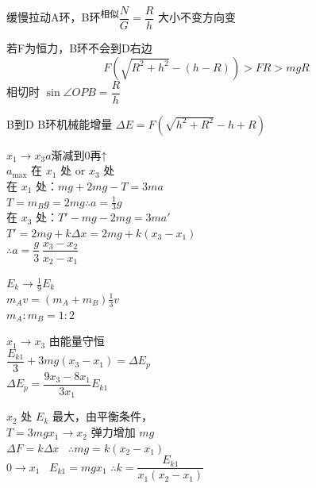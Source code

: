 缓慢拉动A环，B环\textsuperscript{相似}$\dfrac NG=\dfrac Rh$ 大小不变方向变

若F为恒力，B环不会到D右边 %
\[
F\left(\sqrt{R^2+h^2}-(h-R)\right)>FR>mgR
\]
相切时 $\sin\angle OPB=\dfrac Rh$

B到D B环机械能增量 $\Delta E=F\left(\sqrt{h^2+R^2}-h+R\right)$


$x_1\to x_3$\quad $a$渐减到0再↑\\
$a_{\max}$ 在 $x_1$ 处 or $x_3$ 处\\
在 $x_1$ 处：$mg+2mg-T=3ma$\\
\hspace*{3em}$T=m_Bg=2mg$\quad $\therefore a=\frac13 g$\\
在 $x_3$ 处：$T'-mg-2mg=3ma'$\\
\hspace*{3em}$T'=2mg+k\Delta x=2mg+k(x_3-x_1)$\\
\hspace*{3em}$\therefore a=\dfrac{g}{3}\,\dfrac{x_3-x_2}{x_2-x_1}$ %

$E_k\to\frac19 E_k$\\
$m_Av=(m_A+m_B)\frac13 v$\\
$m_A:m_B=1:2$

\unclear{$\because$} $x_1\to x_3$ 由能量守恒\\
$\dfrac{E_{k1}}{3}+3mg(x_3-x_1)=\Delta E_p$\\
$\Delta E_p=\dfrac{9x_3-8x_1}{3x_1}E_{k1}$

$x_2$ 处 $E_k$ 最大，由平衡条件，\\
\hspace*{1em}$T=3mg$\qquad $x_1\to x_2$ 弹力增加 $mg$\\
\hspace*{2em}$\Delta F=k\Delta x$ \ $\therefore mg=k(x_2-x_1)$\\
\hspace*{2em}$0\to x_1$ \ $E_{k1}=mgx_1$ \quad $\therefore k=\dfrac{E_{k1}}{x_1(x_2-x_1)}$
